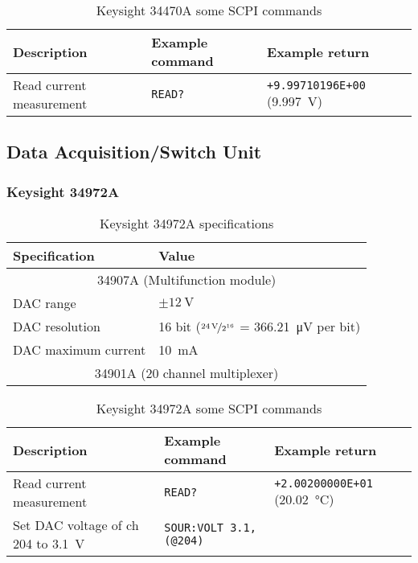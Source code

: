 \begin{table}[H]
	\centering
	\caption{Keysight 34470A some SCPI commands}
	\label{tab:keysight-34470A-scpi}
	\begin{tabularx}{\textwidth}{Xll}
		\toprule
		\textbf{Description} & \textbf{Example command} & \textbf{Example return}\\
		\midrule
		Read current measurement & \texttt{READ?} & \texttt{+9.99710196E+00} (\SI{9.997}{\volt})\\
		\bottomrule
	\end{tabularx}
\end{table}

\subsection{Data Acquisition/Switch Unit}
\subsubsection{Keysight 34972A}\label{app:keysight-34972A}
\begin{table}[H]
	\centering
	\caption{Keysight 34972A specifications}
	\label{tab:keysight-34972A-specs}
	\begin{tabularx}{\textwidth}{ll}
		\toprule
		\textbf{Specification} & \textbf{Value}\\
		\midrule
		\multicolumn{2}{c}{34907A (Multifunction module)}\\
		DAC range & $\pm \SI{12}{\volt}$ \\
		DAC resolution & 16 bit ($\nicefrac{\SI{24}{\volt}}{2^{16}}$ = \SI{366.21}{\micro\volt} per bit) \\
		DAC maximum current & \SI{10}{\mA} \\
		\multicolumn{2}{c}{34901A (20 channel multiplexer)}\\
		\bottomrule
	\end{tabularx}
\end{table}

\begin{table}[H]
	\centering
	\caption{Keysight 34972A some SCPI commands}
	\label{tab:keysight-34972A-scpi}
	\begin{tabularx}{\textwidth}{Xll}
		\toprule
		\textbf{Description} & \textbf{Example command} & \textbf{Example return}\\
		\midrule
		Read current measurement & \texttt{READ?} & \texttt{+2.00200000E+01} (\SI{20.02}{\degreeCelsius})\\
		Set DAC voltage of ch 204 to \SI{3.1}{\volt} & \texttt{SOUR:VOLT 3.1,(@204)} & \\
		\bottomrule
	\end{tabularx}
\end{table}


